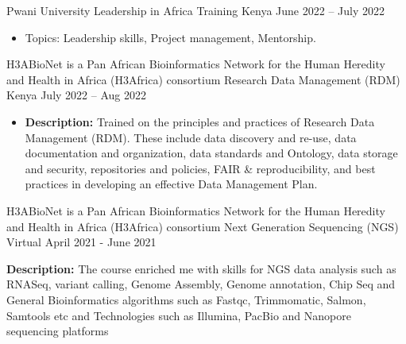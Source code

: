 \begin{cventries}
    \cventry
    {Pwani University} %
    {Leadership in Africa Training} %
    {Kenya} %
    {June 2022 -- July 2022} %
    {
      \begin{itemize} %
        \item Topics: Leadership skills, Project management, Mentorship.
      \end{itemize}
    }
    
    \cventry
    {H3ABioNet is a Pan African Bioinformatics Network for the Human Heredity and Health in Africa (H3Africa) consortium} %
    {Research Data Management (RDM)} %
    {Kenya} %
    {July 2022 -- Aug 2022} %
    {
      \begin{itemize} %
        \item \textbf{Description:} Trained on the principles and practices of Research Data Management (RDM). These include data discovery and re-use, data documentation and organization, data standards and Ontology, data storage and security, repositories and policies, FAIR \& reproducibility, and best practices in developing an effective Data Management Plan.
      \end{itemize}
    }


    \cventry
    {H3ABioNet is a Pan African Bioinformatics Network for the Human Heredity and Health in Africa (H3Africa) consortium} %
    { Next Generation Sequencing (NGS) } %
    {Virtual} %
    {April 2021 - June 2021} %
    {
      \begin{itemize} %
        \textbf{Description:} {The course enriched me with skills for NGS data analysis such as RNASeq, variant calling, Genome Assembly, Genome annotation, Chip Seq and General Bioinformatics algorithms such as Fastqc, Trimmomatic, Salmon, Samtools etc and Technologies such as Illumina, PacBio and Nanopore sequencing platforms}
      \end{itemize}
    }
    
\end{cventries}

